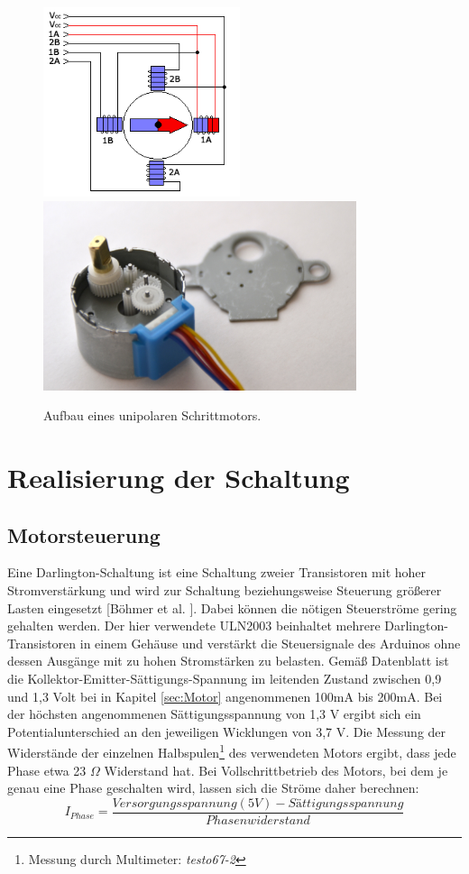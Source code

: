 \documentclass[11pt, titlepage, fleqn]{report}
\begin{document}
				\begin{figure}[htbp]
					\centering
					\includegraphics[height=15em]{./img/motor_stepper_unipolar.png}
					\includegraphics[height=15em]{./img/gear.png}
					\caption{ Aufbau eines unipolaren Schrittmotors.
					\label{fig:imgMotor}}
				\end{figure}
		\newpage
		\section{Realisierung der Schaltung}
			\subsection{Motorsteuerung}
			\label{sec:Motorsteuerung}
				Eine Darlington-Schaltung ist eine Schaltung zweier Transistoren mit hoher Stromverstärkung und wird zur Schaltung beziehungsweise Steuerung größerer Lasten eingesetzt [Böhmer et al. \cite[S.290]{Darlington}]. Dabei können die nötigen Steuerströme gering gehalten werden. Der hier verwendete ULN2003 beinhaltet mehrere Darlington-Transistoren in einem 
				Gehäuse und verstärkt die Steuersignale des Arduinos ohne dessen Ausgänge mit zu hohen Stromstärken zu belasten. Gemäß Datenblatt ist die Kollektor-Emitter-Sättigungs-Spannung im leitenden Zustand zwischen 0,9 und 1,3 Volt bei in Kapitel \ref{sec:Motor} angenommenen 100mA bis 200mA.
				Bei der höchsten angenommenen Sättigungsspannung von 1,3 V ergibt sich ein Potentialunterschied an den jeweiligen Wicklungen von 3,7 V.
				Die Messung der Widerstände der einzelnen Halbspulen\footnote{Messung durch Multimeter: \textit{testo67-2}} des verwendeten Motors ergibt, dass jede Phase etwa 23 $\Omega$ Widerstand hat. Bei Vollschrittbetrieb des Motors, bei dem je genau eine Phase geschalten wird, lassen sich die Ströme daher berechnen:
				\begin{equation}
					I_{Phase}=\frac{Versorgungsspannung (5V) - Sättigungsspannung}{Phasenwiderstand}
				\end{equation}
\end{document}
